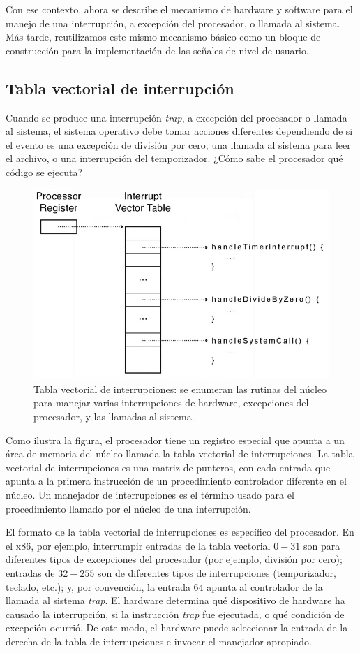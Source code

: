 \documentclass[10pt]{book}
\begin{document}
Con ese contexto, ahora se describe el mecanismo de hardware y software para el manejo de una interrupción, a excepción del procesador, o llamada al sistema. Más tarde, reutilizamos este mismo mecanismo básico como un bloque de construcción para la implementación de las señales de nivel de usuario.

\subsection{Tabla vectorial de interrupción}
Cuando se produce una interrupción \textit{trap}, a excepción del procesador o llamada al sistema, el sistema operativo debe tomar acciones diferentes dependiendo de si el evento es una excepción de división por cero, una llamada al sistema para leer el archivo, o una interrupción del temporizador. ¿Cómo sabe el procesador qué código se ejecuta?
\begin{figure}[tbhp]
\centerline{\includegraphics[scale=0.55]{img/fig0204}}
\caption{Tabla vectorial de interrupciones: se enumeran las rutinas del núcleo para manejar varias interrupciones de hardware, excepciones del procesador, y las llamadas al sistema.}
\label{fig0204}
\end{figure}

Como ilustra la figura, el procesador tiene un registro especial que apunta a un área de memoria del núcleo llamada la tabla vectorial de interrupciones. La tabla vectorial de interrupciones es una matriz de punteros, con cada entrada que apunta a la primera instrucción de un procedimiento controlador diferente en el núcleo. Un manejador de interrupciones es el término usado para el procedimiento llamado por el núcleo de una interrupción.

El formato de la tabla vectorial de interrupciones es específico del procesador. En el x86, por ejemplo, interrumpir entradas de la tabla vectorial $0-31$ son para diferentes tipos de excepciones del procesador (por ejemplo, división por cero); entradas de $32 - 255$ son de diferentes tipos de interrupciones (temporizador, teclado, etc.); y, por convención, la entrada $64$ apunta al controlador de la llamada al sistema \textit{trap}. El hardware determina qué dispositivo de hardware ha causado la interrupción, si la instrucción \textit{trap} fue ejecutada, o qué condición de excepción ocurrió. De este modo, el hardware puede seleccionar la entrada de la derecha de la tabla de interrupciones e invocar el manejador apropiado.
\end{document}
